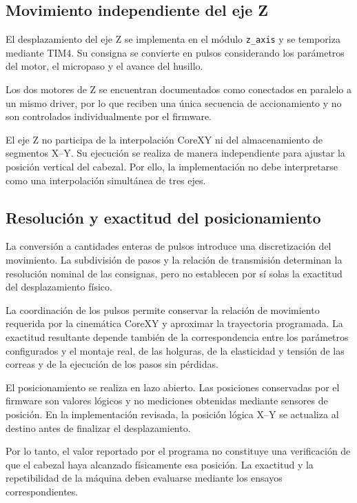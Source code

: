 \documentclass[blue,fullpaper]{ludusofficial}  %
\begin{document}
\subsection{Movimiento independiente del eje Z}

El desplazamiento del eje Z se implementa
en el módulo \texttt{z\_axis} y se temporiza
mediante TIM4. Su consigna se convierte
en pulsos considerando los parámetros
del motor, el micropaso y el avance del husillo.

Los dos motores de Z se encuentran documentados
como conectados en paralelo a un mismo driver,
por lo que reciben una única secuencia
de accionamiento y no son controlados
individualmente por el firmware.

El eje Z no participa de la interpolación CoreXY
ni del almacenamiento de segmentos X--Y.
Su ejecución se realiza de manera independiente
para ajustar la posición vertical del cabezal.
Por ello, la implementación no debe interpretarse
como una interpolación simultánea de tres ejes.

\subsection{Resolución y exactitud del posicionamiento}

La conversión a cantidades enteras de pulsos
introduce una discretización del movimiento.
La subdivisión de pasos y la relación de transmisión
determinan la resolución nominal de las consignas,
pero no establecen por sí solas la exactitud
del desplazamiento físico.

La coordinación de los pulsos permite conservar
la relación de movimiento requerida por la
cinemática CoreXY y aproximar la trayectoria
programada. La exactitud resultante depende
también de la correspondencia entre los parámetros
configurados y el montaje real, de las holguras,
de la elasticidad y tensión de las correas
y de la ejecución de los pasos sin pérdidas.

El posicionamiento se realiza en lazo abierto.
Las posiciones conservadas por el firmware
son valores lógicos y no mediciones obtenidas
mediante sensores de posición. En la implementación
revisada, la posición lógica X--Y se actualiza
al destino antes de finalizar el desplazamiento.

Por lo tanto, el valor reportado por el programa
no constituye una verificación de que el cabezal
haya alcanzado físicamente esa posición.
La exactitud y la repetibilidad de la máquina
deben evaluarse mediante los ensayos correspondientes.
\end{document}
